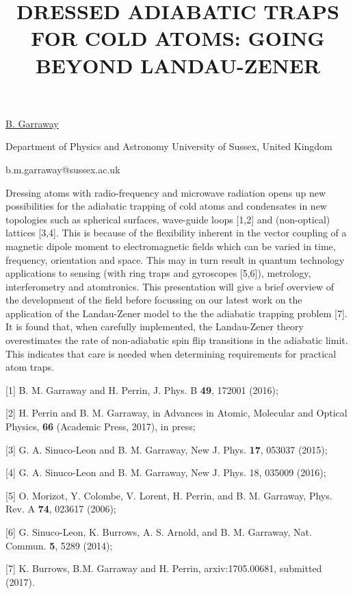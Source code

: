 \title{DRESSED ADIABATIC TRAPS FOR COLD ATOMS: GOING BEYOND LANDAU-ZENER}

\underline{B. Garraway} 

{\normalsize{\vspace{-4mm}
Department of Physics and Astronomy
University of Sussex,
United Kingdom

\email b.m.garraway@sussex.ac.uk}}

Dressing atoms with radio-frequency and microwave radiation opens up new possibilities for the adiabatic trapping of cold atoms and condensates in new topologies such as spherical surfaces, wave-guide loops [1,2] and (non-optical) lattices [3,4].  This is because of the flexibility inherent in the vector coupling of a magnetic dipole moment to electromagnetic fields which can be varied in time, frequency, orientation and space. This may in turn result in quantum technology applications to sensing (with ring traps and gyroscopes [5,6]), metrology, interferometry and atomtronics.  This presentation will give a brief overview of the development of the field before focussing on our latest work on the application of the Landau-Zener model to the the adiabatic trapping problem [7].  It is found that, when carefully implemented, the Landau-Zener theory overestimates the rate of non-adiabatic spin flip transitions in the adiabatic limit.  This indicates that care is needed when determining requirements for practical atom traps.

{\normalsize
[1] B. M. Garraway and H. Perrin, J. Phys. B \textbf{49}, 172001 (2016);
\vsp

[2] H. Perrin and B. M. Garraway, in Advances in Atomic, Molecular and Optical Physics, \textbf{66} (Academic Press, 2017), in press;
\vsp

[3] G. A. Sinuco-Leon and B. M. Garraway, New J. Phys. \textbf{17}, 053037 (2015);
\vsp

[4] G. A. Sinuco-Leon and B. M. Garraway, New J. Phys. 18, 035009 (2016);
\vsp

[5] O. Morizot, Y. Colombe, V. Lorent, H. Perrin, and B. M. Garraway, Phys. Rev. A \textbf{74}, 023617 (2006);
\vsp

[6] G. Sinuco-Leon, K. Burrows, A. S. Arnold, and B. M. Garraway, Nat. Commun. \textbf{5}, 5289 (2014);
\vsp

[7] K. Burrows, B.M. Garraway and H. Perrin, arxiv:1705.00681, submitted (2017).
}

\vspace{\baselineskip} 